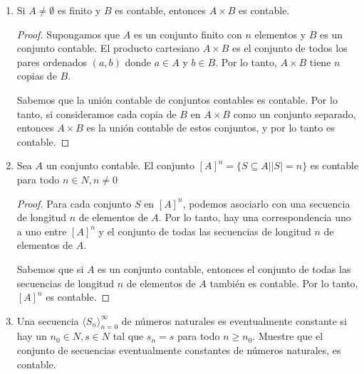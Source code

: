 \documentclass{article}
\begin{document}
\begin{enumerate}
\begin{enumerate}
      \item $|seq(A_1)| = |seq(A_2)|$
	\begin{proof}
	  Una secuencia en un conjunto $A$, denotada como $seq(A)$, es una función de los números naturales en $A$. La cardinalidad de $seq(A)$ es igual a la cardinalidad de $A$ elevada a la potencia del conjunto de los números naturales.

	  Supongamos que $|A_1| = |A_2|$. Esto significa que los conjuntos $A_1$ y $A_2$ tienen la misma cantidad de elementos.

	  Por lo tanto, $|seq(A_1)| =|A_1|^{\aleph_0}$ y $|seq(A_2)| = |A_2|^{\aleph_0}$. Dado que $|A_1| = |A_2|$, podemos concluir que $|seq(A_1)| = |seq(A_2)|$.
	\end{proof}
    \end{enumerate}
  \item Si $A \neq \emptyset$ es finito y $B$ es contable, entonces $A \times B$ es contable.
    
    \begin{proof}
      Supongamos que $A$ es un conjunto finito con $n$ elementos y $B$ es un conjunto contable. El producto cartesiano $A \times B$ es el conjunto de todos los pares ordenados $(a, b)$ donde $a \in A$ y $b \in B$. Por lo tanto, $A \times B$ tiene $n$ copias de $B$.

      Sabemos que la unión contable de conjuntos contables es contable. Por lo tanto, si consideramos cada copia de $B$ en $A \times B$ como un conjunto separado, entonces $A \times B$ es la unión contable de estos conjuntos, y por lo tanto es contable.
    \end{proof}

  \item Sea $A$ un conjunto contable. El conjunto $[A]^{n} = \{S \subseteq A | |S| = n\}$ es contable para todo $n \in N, n \neq 0$
    
    \begin{proof}
      Para cada conjunto $S$ en $[A]^n$, podemos asociarlo con una secuencia de longitud $n$ de elementos de $A$. Por lo tanto, hay una correspondencia uno a uno entre $[A]^n$ y el conjunto de todas las secuencias de longitud $n$ de elementos de $A$.

      Sabemos que si $A$ es un conjunto contable, entonces el conjunto de todas las secuencias de longitud $n$ de elementos de $A$ también es contable. Por lo tanto, $[A]^n$ es contable.
    \end{proof}

  \item Una secuencia $\langle S_n \rangle_{n=0}^{\infty}$ de números naturales es eventualmente constante si hay un $n_0 \in N, s \in N$ tal que $s_n = s$ para todo $n \geq n_0$. Muestre que el conjunto de secuencias eventualmente constantes de números naturales, es contable.
    

\end{enumerate}
\end{document}
